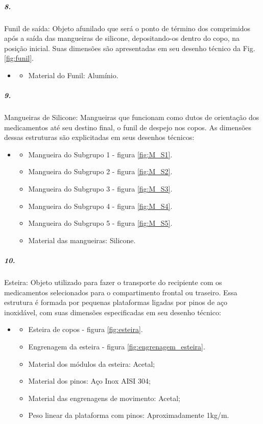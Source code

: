  
 \subparagraph*{8.}\label{retorno_funil}
 Funil de saída: Objeto afunilado que será o ponto de término dos comprimidos após a saída das mangueiras de silicone, depositando-os dentro do copo, na posição inicial. Suas dimensões são apresentadas em seu desenho técnico da Fig. \ref{fig:funil}.
 
 \begin{itemize}
   \item[]
   \begin{itemize}
       \item  Material do Funil: Alumínio.
   \end{itemize}
   \end{itemize}
  
  
 \subparagraph*{9.}\label{retorno_mangueira}
 Mangueiras de Silicone: Mangueiras que funcionam como dutos de orientação dos medicamentos até seu destino final, o funil de despejo nos copos. As dimensões dessas estruturas são explicitadas em seus desenhos técnicos:
 
 
 \begin{itemize}
    \item[]
    \begin{itemize}
    \item  Mangueira do Subgrupo 1 - figura \ref{fig:M_S1}.
    \item  Mangueira do Subgrupo 2 - figura \ref{fig:M_S2}.
    \item  Mangueira do Subgrupo 3 - figura \ref{fig:M_S3}.
    \item  Mangueira do Subgrupo 4 - figura \ref{fig:M_S4}.
    \item  Mangueira do Subgrupo 5 - figura \ref{fig:M_S5}.
    \item Material das mangueiras: Silicone.
     \end{itemize}
 \end{itemize}
 

\subparagraph*{10.}\label{retorno_esteira}
Esteira: Objeto utilizado para fazer o transporte do recipiente com os medicamentos selecionados para o compartimento frontal ou traseiro. Essa estrutura é formada por pequenas plataformas ligadas por pinos de aço inoxidável, com suas dimensões especificadas em seu desenho técnico:


\begin{itemize}
    \item[]
    \begin{itemize}
    \item  Esteira de copos - figura \ref{fig:esteira}.
    \item  Engrenagem da esteira - figura \ref{fig:engrenagem_esteira}.
    \item  Material dos módulos da esteira: Acetal;
    \item  Material dos pinos: Aço Inox AISI 304;
    \item  Material das engrenagens de movimento: Acetal;
    \item  Peso linear da plataforma com pinos: Aproximadamente 1kg/m.
    \end{itemize}
\end{itemize}   


